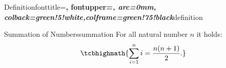 \documentclass[preview]{standalone}
\begin{document}


%
  {Definition}{fonttitle=\bfseries\upshape, fontupper=\slshape,
     arc=0mm, colback=green!5!white,colframe=green!75!black}{definition}

\begin{defn*}{Summation of Numbers}{summation}
  For all natural number $n$ it holds:
  \begin{equation}
  \tcbhighmath{\sum\limits_{i=1}^n i = \frac{n(n+1)}{2}.}
  \end{equation}
\end{defn*}
\end{document}
